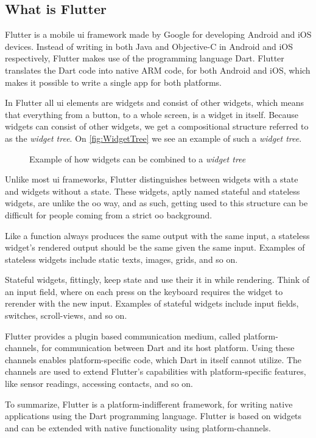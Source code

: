 \subsection{What is Flutter}

Flutter is a mobile \gls{ui} framework made by Google for developing Android and iOS devices\cite{flutterFAQ}. Instead of writing in both Java and Objective-C in Android and iOS respectively, Flutter makes use of the programming language Dart. Flutter translates the Dart code into native ARM code, for both Android and iOS, which makes it possible to write a single app for both platforms. 

In Flutter all \gls{ui} elements are widgets and consist of other widgets, which means that everything from a button, to a whole screen, is a widget in itself. Because widgets can consist of other widgets, we get a compositional structure referred to as the \textit{widget tree}. On \autoref{fig:WidgetTree} we see an example of such a \textit{widget tree}.

\begin{figure}[h]
    \centering
    \caption{Example of how widgets can be combined to a \textit{widget tree}}
    \label{fig:WidgetTree}
\end{figure}

Unlike most \gls{ui} frameworks, Flutter distinguishes between widgets with a state and widgets without a state. These widgets, aptly named stateful and stateless widgets, are unlike the \gls{oo} way, and as such, getting used to this structure can be difficult for people coming from a strict \gls{oo} background.

Like a function always produces the same output with the same input, a stateless widget's rendered output should be the same given the same input. Examples of stateless widgets include static texts, images, grids, and so on. 

Stateful widgets, fittingly, keep state and use their it in while rendering. Think of an input field, where on each press on the keyboard requires the widget to rerender with the new input. Examples of stateful widgets include input fields, switches, scroll-views, and so on.

Flutter provides a plugin based communication medium, called platform-channels, for communication between Dart and its host platform\cite{flutter_plugins}. Using these channels enables platform-specific code, which Dart in itself cannot utilize. The channels are used to extend Flutter's capabilities with platform-specific features, like sensor readings, accessing contacts, and so on.

To summarize, Flutter is a platform-indifferent framework, for writing native applications using the Dart programming language. Flutter is based on widgets and can be extended with native functionality using platform-channels.
